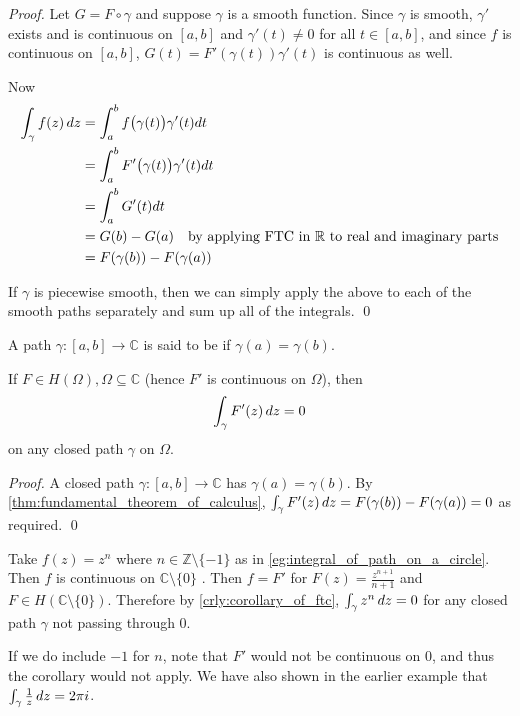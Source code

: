\documentclass[notoc,notitlepage]{tufte-book}
\begin{document}
\begin{proof}
	Let $G = F \circ \gamma$ and suppose $\gamma$ is a smooth function. Since $\gamma$ is smooth, $\gamma'$ exists and is continuous on $[a, b]$ and $\gamma'(t) \neq 0$ for all $t \in [a, b]$, and since $f$ is continuous on $[a, b]$, $G(t) = F'(\gamma(t))\gamma'(t)$ is continuous as well.

	Now
	\begin{align*}
		\int_{\gamma} f(z) \mathop{}\!d{z}
			&= \int_{a}^{b} f\big(\gamma(t)\big)\gamma'(t) dt \\
			&= \int_{a}^{b} F'\big(\gamma(t)\big)\gamma'(t) dt \\
			&= \int_{a}^{b} G'(t) dt \\
			&= G(b) - G(a) \quad \text{by applying FTC in } \mathbb{R} \text{ to real and imaginary parts} \\
			&= F(\gamma(b)) - F(\gamma(a))
	\end{align*}

	If $\gamma$ is piecewise smooth, then we can simply apply the above to each of the smooth paths separately and sum up all of the integrals. \qed
\end{proof}

\begin{defn}\label{defn:closed_path}
	A path $\gamma: [a, b] \to \mathbb{C}$ is said to be  if $\gamma(a) = \gamma(b)$.
\end{defn}

\begin{crly}\label{crly:corollary_of_ftc}
	If $F \in H(\Omega), \Omega \subseteq \mathbb{C}$ (hence $F'$ is continuous on $\Omega$), then
	\begin{equation*}
		\int_{\gamma} F'(z) \mathop{}\!d{z} = 0
	\end{equation*}
	on any closed path $\gamma$ on $\Omega$.
\end{crly}

\begin{proof}
	A closed path $\gamma: [a, b] \to \mathbb{C}$ has $\gamma(a) = \gamma(b)$. By \cref{thm:fundamental_theorem_of_calculus}, $\int_{\gamma} F'(z) \mathop{}\!d{z} = F(\gamma(b)) - F(\gamma(a)) = 0$ as required. \qed
\end{proof}

\begin{eg}
	Take $f(z) = z^n$ where $n \in \mathbb{Z} \setminus \{-1\}$ as in \cref{eg:integral_of_path_on_a_circle}. Then $f$ is continuous on $\mathbb{C} \setminus \{0\}$ . Then $f = F'$ for $F(z) = \frac{z^{n + 1}}{n + 1}$ and $F \in H(\mathbb{C} \setminus \{0\})$. Therefore by \cref{crly:corollary_of_ftc}, $\int_{\gamma} z^n \mathop{}\!d{z} = 0$ for any closed path $\gamma$ not passing through $0$.

	If we do include $-1$ for $n$, note that $F'$ would not be continuous on $0$, and thus the corollary would not apply. We have also shown in the earlier example that $\int_{\gamma} \frac{1}{z} \mathop{}\!d{z} = 2 \pi i$.
\end{eg}
\end{document}
